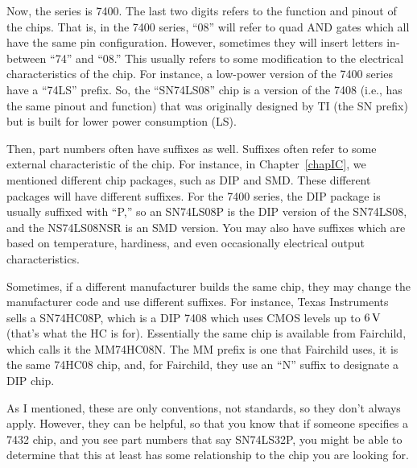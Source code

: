 Now, the series is 7400.  
The last two digits refers to the function and pinout of the chips.
That is, in the 7400 series, ``08'' will refer to quad AND gates which all have the same pin configuration.
However, sometimes they will insert letters in-between ``74'' and ``08.''
This usually refers to some modification to the electrical characteristics of the chip.
For instance, a low-power version of the 7400 series have a ``74LS'' prefix.
So, the ``SN74LS08'' chip is a version of the 7408 (i.e., has the same pinout and function) that was originally designed by TI (the SN prefix) but is built for lower power consumption (LS).

Then, part numbers often have suffixes as well.
Suffixes often refer to some external characteristic of the chip.
For instance, in Chapter~\ref{chapIC}, we mentioned different chip packages, such as DIP and SMD.
These different packages will have different suffixes.
For the 7400 series, the DIP package is usually suffixed with ``P,'' so an SN74LS08P is the DIP version of the SN74LS08, and the NS74LS08NSR is an SMD version.
You may also have suffixes which are based on temperature, hardiness, and even occasionally electrical output characteristics.

Sometimes, if a different manufacturer builds the same chip, they may change the manufacturer code and use different suffixes.  
For instance, Texas Instruments sells a SN74HC08P, which is a DIP 7408 which uses CMOS levels up to $6\,\si{\volt}$ (that's what the HC is for).
Essentially the same chip is available from Fairchild, which calls it the MM74HC08N.
The MM prefix is one that Fairchild uses, it is the same 74HC08 chip, and, for Fairchild, they use an ``N'' suffix to designate a DIP chip.

As I mentioned, these are only conventions, not standards, so they don't always apply.
However, they can be helpful, so that you know that if someone specifies a 7432 chip, and you see part numbers that say SN74LS32P, you might be able to determine that this at least has some relationship to the chip you are looking for.

%
